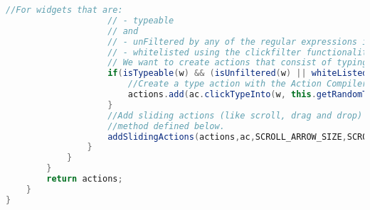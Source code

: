 \begin{lstlisting}[language=java, basicstyle=\tiny, caption=Protocol for the real world application, label=code:real-world-app-protocol]
                    //For widgets that are:
                    // - typeable
                    // and
                    // - unFiltered by any of the regular expressions in the Filter-tab, or
                    // - whitelisted using the clickfilter functionality in SPY mode (CAPS_LOCK + SHIFT + CNTR + Click)
                    // We want to create actions that consist of typing into them
                    if(isTypeable(w) && (isUnfiltered(w) || whiteListed(w))) {
                        //Create a type action with the Action Compiler, and add it to the set of derived actions
                        actions.add(ac.clickTypeInto(w, this.getRandomText(w), true));
                    }
                    //Add sliding actions (like scroll, drag and drop) to the derived actions
                    //method defined below.
                    addSlidingActions(actions,ac,SCROLL_ARROW_SIZE,SCROLL_THICK,w);
                }
            }
        }
        return actions;
    }
}
\end{lstlisting}